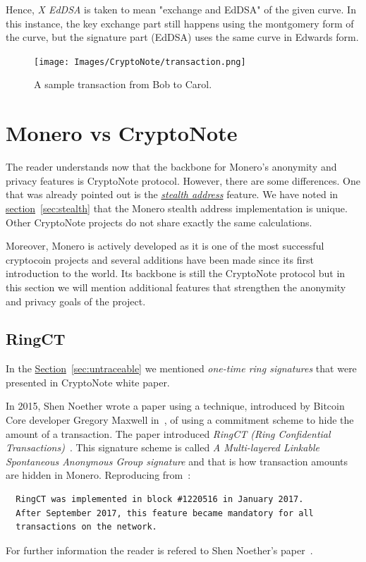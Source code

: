 Hence, \emph{X EdDSA} is taken to mean "exchange and EdDSA" of the given curve. In this instance, the key exchange part still happens using the montgomery form of the curve, but the signature part (EdDSA) uses the same curve in Edwards form.
\pagebreak

\begin{figure}[H]
  \centering
  \texttt{[image: Images/CryptoNote/transaction.png]}
  \caption{A sample transaction from Bob to Carol.~\cite{cryptonote}}
  \label{fig:transaction}
\end{figure}
\pagebreak

\section{Monero vs CryptoNote}
The reader understands now that the backbone for Monero's anonymity and privacy features is CryptoNote protocol. However, there are some differences. One that was already pointed out is the \hyperref[sec:stealth]{\emph{stealth address}} feature. We have noted in \hyperref[sec:stealth]{section}~\ref{sec:stealth} that the Monero stealth address implementation is unique. Other CryptoNote projects do not share exactly the same calculations.

Moreover, Monero is actively developed as it is one of the most successful cryptocoin projects and several additions have been made since its first introduction to the world. Its backbone is still the CryptoNote protocol but in this section we will mention additional features that strengthen the anonymity and privacy goals of the project.

\subsection{RingCT}
In the \hyperref[sec:untraceable]{Section}~\ref{sec:untraceable} we mentioned \emph{one-time ring signatures} that were presented in CryptoNote white paper.

In 2015, Shen Noether wrote a paper using a technique, introduced by Bitcoin Core developer Gregory Maxwell in~\cite{elements}, of using a commitment scheme to hide the amount of a transaction. The paper introduced \emph{RingCT (Ring Confidential Transactions)}~\cite{ringCT}. This signature scheme is called \emph{A Multi-layered Linkable Spontaneous Anonymous Group signature} and that is how transaction amounts are hidden in Monero. Reproducing from~\cite{getmonero}:

\begin{verbatim}
  RingCT was implemented in block #1220516 in January 2017.
  After September 2017, this feature became mandatory for all
  transactions on the network.
\end{verbatim}
For further information the reader is refered to Shen Noether's paper~\cite{ringCT}.

